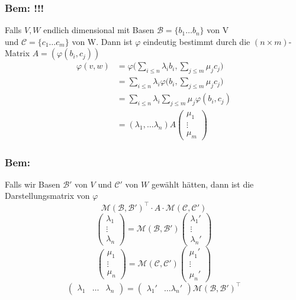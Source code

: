 \documentclass[titlepage,12pt,a4paper,ngerman]{report}
\begin{document}
\subsubsection*{Bem: !!!} Falls $V, W$ endlich dimensional mit Basen $\mathcal B = \{b_1 \dots b_n\}$ von V\\
und $\mathcal C = \{c_1 \dots c_m\}$ von W. Dann ist $\varphi$ eindeutig bestimmt durch die $(n \times m)$-Matrix $A= (\varphi(b_i, c_j))$
\begin{align*}
\varphi(v, w) &= \varphi \bigg(\sum_{i \leq n} \lambda_i b_i, \sum_{j \leq m}\mu_j c_j\bigg)\\
&= \sum_{i \leq n} \lambda_i \varphi \bigg(b_i, \sum_{j \leq m} \mu_j c_j \bigg)\\
&= \sum_{i \leq n} \lambda_i \sum_{j \leq m} \mu_j \varphi(b_i, c_j)\\
&= (\lambda_1, \dots \lambda_n)A \begin{pmatrix}
\mu_1 \\ \vdots \\ \mu_m
\end{pmatrix}
\end{align*}

\subsubsection{Bem:}
Falls wir Basen $ \mathcal{B}' $ von $ V $ und $ \mathcal{C}' $ von $ W $ gewählt hätten, dann ist die Darstellungsmatrix von $ \varphi $
$$\mathcal{M}(\mathcal{B},\mathcal{B}')^\top \cdot A \cdot \mathcal{M}(\mathcal{C}, \mathcal{C}')$$
$$ \begin{pmatrix}
\lambda_1\\
\vdots\\
\lambda_n
\end{pmatrix} = \mathcal{M}(\mathcal{B},\mathcal{B}') \begin{pmatrix}
\lambda_1'\\
\vdots\\
\lambda_n'
\end{pmatrix}$$
$$ \begin{pmatrix}
\mu_1\\
\vdots\\
\mu_n
\end{pmatrix} = \mathcal{M}(\mathcal{C},\mathcal{C}') \begin{pmatrix}
\mu_1'\\
\vdots\\
\mu_n'
\end{pmatrix}$$
$$\begin{pmatrix}
\lambda_1 & \dots & \lambda_n
\end{pmatrix} = \begin{pmatrix}
\lambda_1' & \dots \lambda_n'
\end{pmatrix} \mathcal{M}(\mathcal{B},\mathcal{B}')^\top$$
\end{document}

